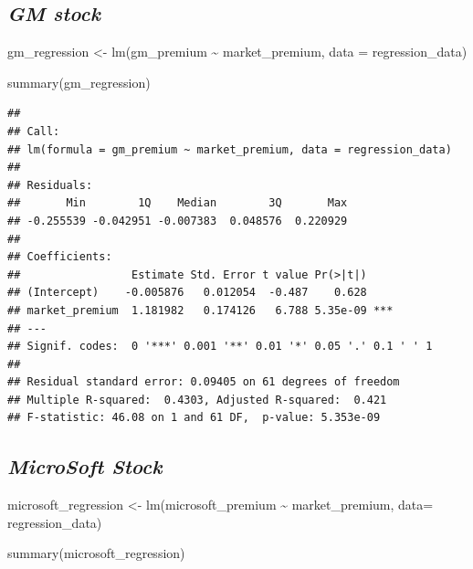 \documentclass[
]{article}
\newenvironment{Shaded}{\begin{snugshade}}{\end{snugshade}}
\newcommand{\AttributeTok}[1]{\textcolor[rgb]{0.77,0.63,0.00}{#1}}
\newcommand{\FunctionTok}[1]{\textcolor[rgb]{0.00,0.00,0.00}{#1}}
\newcommand{\NormalTok}[1]{#1}
\newcommand{\OtherTok}[1]{\textcolor[rgb]{0.56,0.35,0.01}{#1}}
\newcommand{\SpecialCharTok}[1]{\textcolor[rgb]{0.00,0.00,0.00}{#1}}
\begin{document}
\hypertarget{gm-stock}{%
\subsection{\texorpdfstring{\textbf{\emph{GM
stock}}}{GM stock}}\label{gm-stock}}

\begin{Shaded}
\begin{Highlighting}[]
\NormalTok{gm\_regression }\OtherTok{\textless{}{-}} \FunctionTok{lm}\NormalTok{(gm\_premium }\SpecialCharTok{\textasciitilde{}}\NormalTok{ market\_premium, }\AttributeTok{data =}\NormalTok{ regression\_data)}

\FunctionTok{summary}\NormalTok{(gm\_regression)}
\end{Highlighting}
\end{Shaded}

\begin{verbatim}
## 
## Call:
## lm(formula = gm_premium ~ market_premium, data = regression_data)
## 
## Residuals:
##       Min        1Q    Median        3Q       Max 
## -0.255539 -0.042951 -0.007383  0.048576  0.220929 
## 
## Coefficients:
##                 Estimate Std. Error t value Pr(>|t|)    
## (Intercept)    -0.005876   0.012054  -0.487    0.628    
## market_premium  1.181982   0.174126   6.788 5.35e-09 ***
## ---
## Signif. codes:  0 '***' 0.001 '**' 0.01 '*' 0.05 '.' 0.1 ' ' 1
## 
## Residual standard error: 0.09405 on 61 degrees of freedom
## Multiple R-squared:  0.4303, Adjusted R-squared:  0.421 
## F-statistic: 46.08 on 1 and 61 DF,  p-value: 5.353e-09
\end{verbatim}

\hypertarget{microsoft-stock}{%
\subsection{\texorpdfstring{\textbf{\emph{MicroSoft
Stock}}}{MicroSoft Stock}}\label{microsoft-stock}}

\begin{Shaded}
\begin{Highlighting}[]
\NormalTok{microsoft\_regression }\OtherTok{\textless{}{-}} \FunctionTok{lm}\NormalTok{(microsoft\_premium }\SpecialCharTok{\textasciitilde{}}\NormalTok{ market\_premium, }\AttributeTok{data=}\NormalTok{ regression\_data)}

\FunctionTok{summary}\NormalTok{(microsoft\_regression)}
\end{Highlighting}
\end{Shaded}
\end{document}
